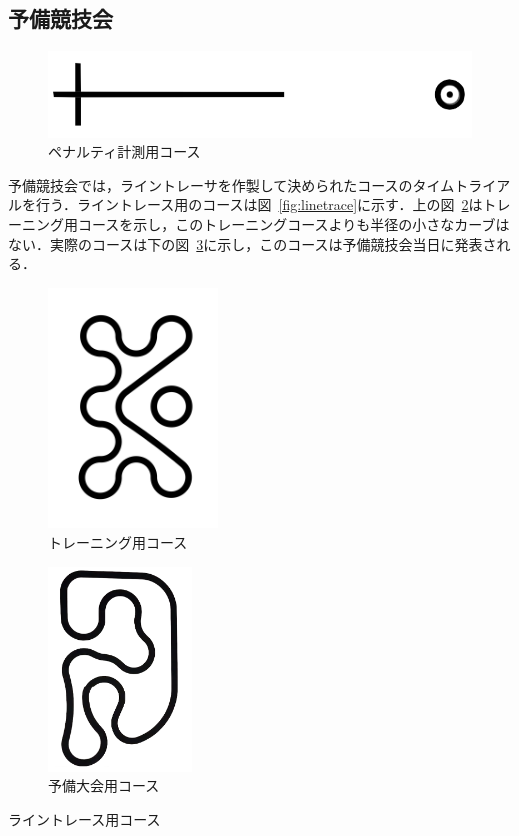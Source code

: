 \begin{multicols*}{2}
\section{予備競技会}
\begin{figure}[!b]
  \centering
    \includegraphics[width=14cm]{img/penalty.png}
  \caption{ペナルティ計測用コース} \label{fig:penalty}
\end{figure}

予備競技会では，ライントレーサを作製して決められたコースのタイムトライアルを行う．ライントレース用のコースは図~\ref{fig:linetrace}に示す．上の図~\ref{fig:training}はトレーニング用コースを示し，このトレーニングコースよりも半径の小さなカーブはない．実際のコースは下の図~\ref{fig:yobi}に示し，このコースは予備競技会当日に発表される．

\begin{figurehere}
  \centering
  \begin{subfigure}{0.45\textwidth}
    \centering
    \includegraphics[width=4.5cm,angle=270]{img/training.pdf}
    \caption{トレーニング用コース} \label{fig:training}
  \end{subfigure}
  \begin{subfigure}{0.45\textwidth}
    \centering
    \includegraphics[width=3.8cm,angle=90]{img/yobitaikai.png}
    \caption{予備大会用コース} \label{fig:yobi}
  \end{subfigure}
  \caption{ライントレース用コース}\label{fig:linetrace}
\end{figurehere}


\end{multicols*}
